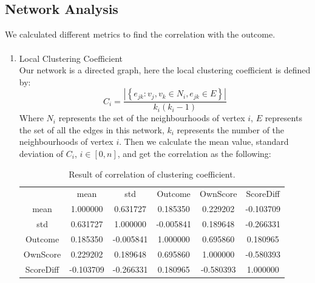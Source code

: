 \documentclass{mcmthesis}
\newcommand{\upcite}[1]{\textsuperscript{\textsuperscript{\cite{#1}}}}
\begin{document}
	\subsection{Network Analysis}\label{network-analysis}
		We calculated different metrics to find the correlation with the outcome. 
		\begin{enumerate}
			\item Local Clustering Coefficient\upcite{4} \\
			Our network is a directed graph, here the local clustering coefficient is defined by: 
			$$C_i=\frac{\left|\left\{e_{jk}:v_j,v_k\in N_i,e_{jk}\in E\right\}\right|}{k_i\left(k_i-1\right)}$$
			Where $N_i$ represents the set of the neighbourhoods of vertex $i$, $E$ represents the set of all the edges in this network, $k_i$ represents the number of the neighbourhoods of vertex $i$. Then we calculate the mean value, standard deviation of $C_i$, $i\in \left[0, n\right]$, and get the correlation as the following: 
			\begin{table}[h!]
				\centering
				\begin{tabular}{cccccc}
					\toprule
					 & mean & std & Outcome & OwnScore & ScoreDiff \\
					mean & 1.000000 & 0.631727 & 0.185350 & 0.229202 & -0.103709 \\
					std & 0.631727 & 1.000000 & -0.005841 & 0.189648 & -0.266331 \\
					Outcome & 0.185350 & -0.005841 & 1.000000 & 0.695860 & 0.180965 \\
					OwnScore & 0.229202 & 0.189648 & 0.695860 & 1.000000 & -0.580393 \\
					ScoreDiff & -0.103709 & -0.266331 & 0.180965 & -0.580393 & 1.000000 \\
					\bottomrule
				\end{tabular}
				\caption{Result of correlation of clustering coefficient. }
			\end{table}
			

\end{enumerate}
\end{document}
